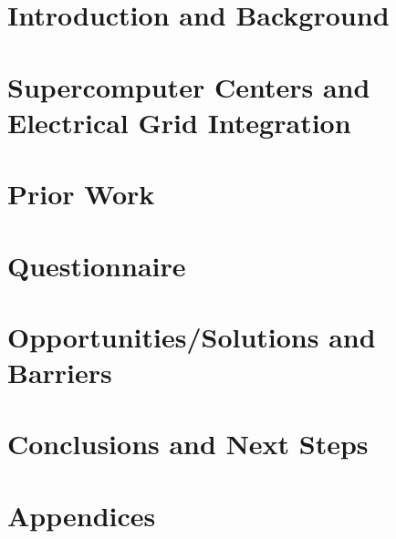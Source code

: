 \documentclass[runningheads]{llncs}
\begin{document}
%
\section{Introduction and Background}

\label{sec:intro}

\section{Supercomputer Centers and Electrical Grid Integration}

\label{sec:supercomputer}

\section{Prior Work}

\label{sec:priorwork}

\section{Questionnaire} 

\label{sec:questionnaire}

\section{Opportunities/Solutions and Barriers} 

\label{sec:opportunities}

\section{Conclusions and Next Steps}

\label{sec:conclusion}

\newpage


%
%

%

\section{Appendices}

\label{sec:appendices}
\end{document}
